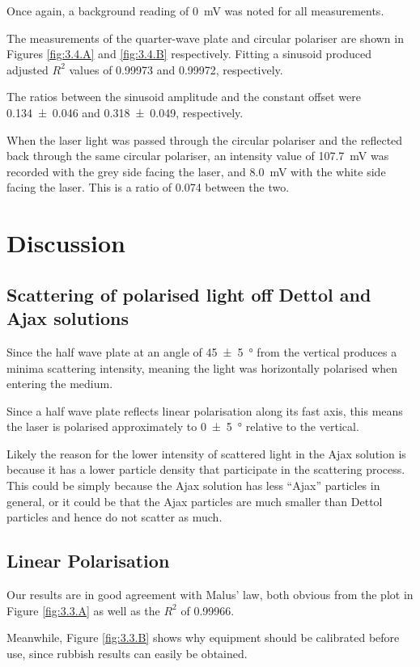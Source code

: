 \documentclass[a4paper]{scrartcl}
\begin{document}
Once again, a background reading of \SI{0}{\milli\volt} was noted for all measurements.

The measurements of the quarter-wave plate and circular polariser are shown in Figures \ref{fig:3.4.A} and \ref{fig:3.4.B} respectively. Fitting a sinusoid produced adjusted \(R^2\) values of 0.99973 and 0.99972, respectively.

The ratios between the sinusoid amplitude and the constant offset were \SI{0.134 \pm 0.046}{} and \SI{0.318 \pm 0.049}{}, respectively.

When the laser light was passed through the circular polariser and the reflected back through the same circular polariser, an intensity value of \SI{107.7}{\milli\volt} was recorded with the grey side facing the laser, and \SI{8.0}{\milli\volt} with the white side facing the laser. This is a ratio of 0.074 between the two.

\section{Discussion}
\subsection{Scattering of polarised light off Dettol and Ajax solutions}
Since the half wave plate at an angle of \SI{45 \pm 5}{\degree} from the vertical produces a minima scattering intensity, meaning the light was horizontally polarised when entering the medium.

Since a half wave plate reflects linear polarisation along its fast axis, this means the laser is polarised approximately to \SI{0 \pm 5}{\degree} relative to the vertical.

Likely the reason for the lower intensity of scattered light in the Ajax solution is because it has a lower particle density that participate in the scattering process. This could be simply because the Ajax solution has less ``Ajax'' particles in general, or it could be that the Ajax particles are much smaller than Dettol particles and hence do not scatter as much.

\subsection{Linear Polarisation}
Our results are in good agreement with Malus' law, both obvious from the plot in Figure \ref{fig:3.3.A} as well as the \(R^2\) of 0.99966. 

Meanwhile, Figure \ref{fig:3.3.B} shows why equipment should be calibrated before use, since rubbish results can easily be obtained.
\end{document}
